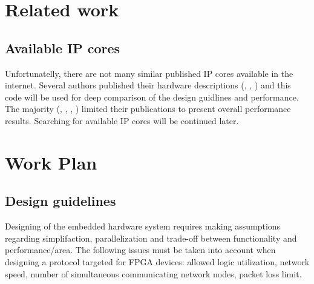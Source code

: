 \documentclass[12pt,a4paper]{article}
\begin{document}
\section{Related work}
\subsection{Available IP cores}
Unfortunatelly, there are not many similar published IP cores available in the internet. Several authors published their hardware descriptions (\cite{Alachiotis11}, \cite{Alachiotis10}, \cite{Zabolotny12}) and this code will be used for deep comparison of the design guidlines and performance. The majority (\cite{Herrmann09}, \cite{Doolittle11}, \cite{Ciobotaru00}, \cite{Lofgren05}) limited their publications to present overall performance results. Searching for available IP cores will be continued later.
\section{Work Plan}
\subsection{Design guidelines}
Designing of the embedded hardware system requires making assumptions regarding simplifaction, parallelization and trade-off between functionality and performance/area. The following issues must be taken into account when designing a protocol targeted for FPGA devices: allowed logic utilization, network speed, number of simultaneous communicating network nodes, packet loss limit.
\end{document}
